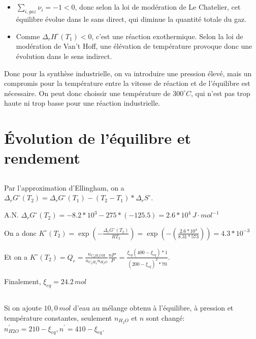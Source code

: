 \documentclass[a4paper,12pt]{book}
\begin{document}
\subsection{}
\begin{itemize}
    \item $\sum_{i,gaz}\nu_i=-1<0$, donc selon la loi de modération de Le Chatelier, cet équilibre évolue dans le sans direct, qui diminue la quantité totale du gaz. 
    \item Comme $\Delta_rH^\circ(T_1)<0$, c'est une réaction exothermique. Selon la loi de modération de Van't Hoff, une élévation de température provoque donc une évolution dans le sens indirect.
\end{itemize}
Donc pour la synthèse industrielle, on va introduire une pression élevé, mais un compromis pour la température 
entre la vitesse de réaction et de l’équilibre est nécessaire. On peut donc choissir une température de $300^\circ C$, qui n'est pas trop haute ni trop basse pour une réaction industrielle.

\section{Évolution de l’équilibre et rendement}

\subsection{}
Par l'approximation d'Ellingham, on a $\Delta_rG^\circ(T_2)=\Delta_rG^\circ(T_1)-(T_2-T_1)*\Delta_rS^\circ$.

\hspace*{\fill} 

A.N. $\Delta_rG^\circ(T_2)=-8.2*10^3-275*(-125.5)=2.6*10^4 \,J\cdot mol^{-1}$

\hspace*{\fill} 

On a donc $K^\circ(T_2)=\exp\left(-\frac{\Delta_rG^\circ(T_2)}{RT_2}\right)=\exp(-\left(\frac{2.6*10^4}{8.31*573}\right))=4.3*10^{-3}$

\hspace*{\fill} 

Et on a $K^\circ(T_2)=Q_r=\frac{n_{C_2H_5OH}}{n_{C_2H_4}n_{H_2O}}\frac{nP^\circ}{P}=\frac{\xi_{eq}(400-\xi_{eq})*1}{(200-\xi_{eq})^2*70}$. 

\hspace*{\fill} 

Finalement, $\boxed{\xi_{eq}= 24.2\,mol}$
\subsection{}
Si on ajoute $10,0\, mol$ d’eau au mélange obtenu à l’équilibre, à pression et température constantes, seulement $n_{H_2O}$ et 
$n$ sont changé: $n_{H2O}^{'}=210-\xi_{eq}, n^{'}=410-\xi_{eq}$. 
\end{document}
